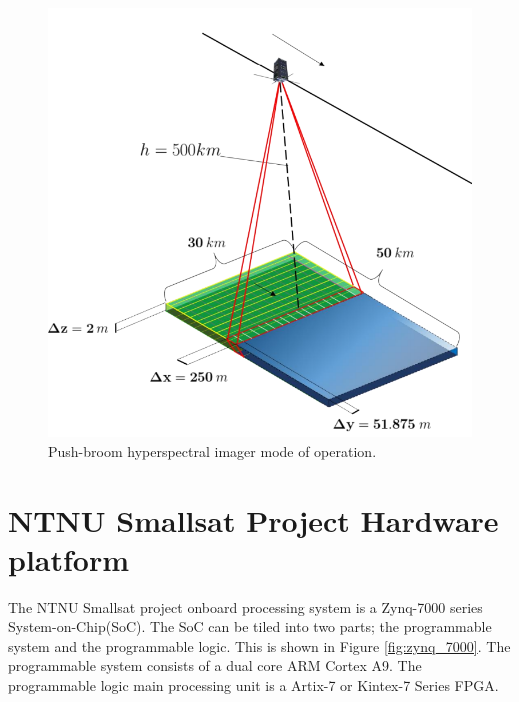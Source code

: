 \begin{figure}[H]
\centering
   \includegraphics[scale=0.36]{images/hyperspectral_imager.PNG}
  \caption{ Push-broom hyperspectral imager mode of operation.  } 
  \label{fig:HSI_functionality}
\end{figure}

\section{NTNU Smallsat Project Hardware platform}
The NTNU Smallsat project onboard processing system is a Zynq-7000 series System-on-Chip(SoC). The SoC can be tiled into two parts; the programmable system and the programmable logic. This is shown in Figure \ref{fig:zynq_7000}. The programmable system consists of a dual core ARM Cortex A9. The programmable logic main processing unit is a Artix-7 or Kintex-7 Series FPGA.


